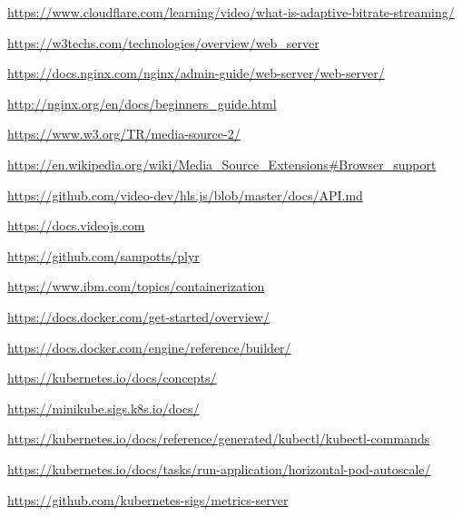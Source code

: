 \documentclass{article}
\begin{document}
\begin{thebibliography}{}
\item \url{https://www.cloudflare.com/learning/video/what-is-adaptive-bitrate-streaming/}

\item \url{https://w3techs.com/technologies/overview/web_server}

\item \url{https://docs.nginx.com/nginx/admin-guide/web-server/web-server/}

\item \url{http://nginx.org/en/docs/beginners_guide.html}

\item \url{https://www.w3.org/TR/media-source-2/}

\item \url{https://en.wikipedia.org/wiki/Media_Source_Extensions#Browser_support}

\item \url{https://github.com/video-dev/hls.js/blob/master/docs/API.md}

\item \url{https://docs.videojs.com}

\item \url{https://github.com/sampotts/plyr}

\item \url{https://www.ibm.com/topics/containerization}

\item \url{https://docs.docker.com/get-started/overview/}

\item \url{https://docs.docker.com/engine/reference/builder/}

\item \url{https://kubernetes.io/docs/concepts/}

\item \url{https://minikube.sigs.k8s.io/docs/}

\item \url{https://kubernetes.io/docs/reference/generated/kubectl/kubectl-commands}

\item \url{https://kubernetes.io/docs/tasks/run-application/horizontal-pod-autoscale/}

\item \url{https://github.com/kubernetes-sigs/metrics-server}

\end{thebibliography}
\end{document}
